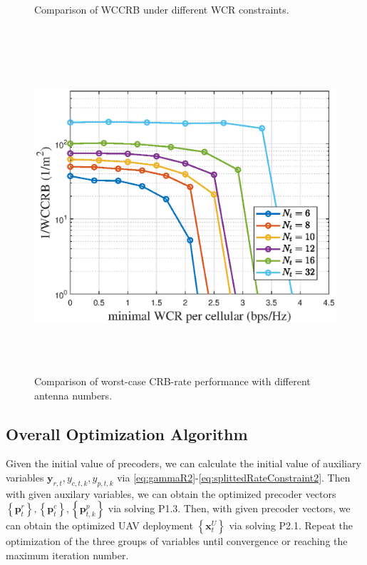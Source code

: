 \documentclass[twocolumn,journal]{IEEEtran}
\begin{document}
\begin{figure}[t]
\begin{minipage}{0.3\textwidth}
    \caption{Comparison of WCCRB under different WCR constraints.}
    \label{fig:boundComparison}
  \end{minipage}
  \hfill
  \begin{minipage}{0.3\textwidth}
    \centering
    \includegraphics[width=\linewidth]{figure/3_figAN.eps}
    \caption{Comparison of worst-case CRB-rate performance with different antenna numbers.}
    \label{fig:boundAntennaNum}
  \end{minipage}
\end{figure}
\subsection{Overall Optimization Algorithm}
Given the initial value of precoders, we can calculate the initial value of auxiliary variables \(\boldsymbol{y}_{r,t},y_{c,t,k},y_{p,t,k}\) via \eqref{eq:gammaR2}-\eqref{eq:splittedRateConstraint2}. Then with given auxilary variables, we can obtain the optimized precoder vectors \(\left\{\boldsymbol{p}^{r}_{t}\right\},\left\{\boldsymbol{p}^{c}_{t}\right\},  \left\{\boldsymbol{p}^{p}_{t,k}\right\}\) via solving P1.3. Then, with given precoder vectors, we can obtain the optimized UAV deployment \(\left\{\boldsymbol{x}^{U}_{t}\right\}\) via solving P2.1. Repeat the optimization of the three groups of variables until convergence or reaching the maximum iteration number. 
\end{document}
